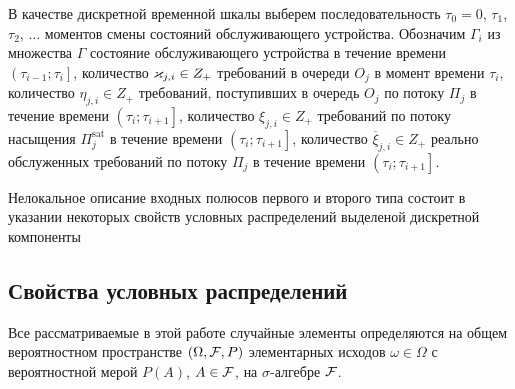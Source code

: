 \documentclass[a4paper,12pt,russian]{extarticle}
\newcommand{\G}{\Gamma}
\begin{document}
В качестве дискретной временной шкалы выберем последовательность $\tau_0=0$, $\tau_1$, $\tau_2$, $\ldots$ моментов смены состояний обслуживающего устройства. Обозначим $\G_i$ из множества $\G$ состояние обслуживающего устройства в течение времени $\left(\tau_{i-1};\tau_i\right]$, количество $\varkappa_{j,i} \in Z_+ $ требований в очереди $O_j$ в момент времени $\tau_i$, количество $\eta_{j,i} \in Z_+$ требований, поступивших в очередь $O_j$ по потоку $\Pi_j$ в течение времени $\left(\tau_{i};\tau_{i+1}\right]$, количество $\xi_{j,i} \in Z_+$ требований по потоку насыщения $\Pi^{\mathrm{sat}}_j$ в течение времени $\left(\tau_{i};\tau_{i+1}\right]$, количество $\overline{\xi}_{j,i}\in Z_+$ реально обслуженных требований по потоку $\Pi_j$ в течение времени $\left(\tau_{i};\tau_{i+1}\right]$.

Нелокальное описание входных полюсов первого и второго типа состоит в указании некоторых свойств условных распределений выделеной дискретной компоненты
%
\subsection{Свойства условных распределений}

Все рассматриваемые в этой работе случайные элементы определяются на общем вероятностном пространстве $\left(\Omega, {\cal F}, P\right)$ элементарных исходов $\omega \in \Omega$ с вероятностной мерой $P(A)$, $A \in {\cal F}$, на $\sigma$-алгебре ${\cal F}$. 
\end{document}
